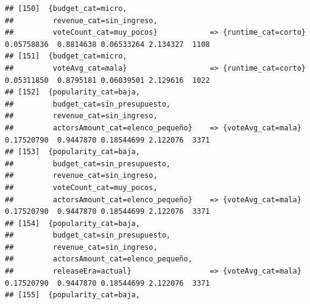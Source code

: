 \documentclass[
]{article}
\begin{document}
\begin{verbatim}
## [150]  {budget_cat=micro,                                                                                                       
##         revenue_cat=sin_ingreso,                                                                                                
##         voteCount_cat=muy_pocos}            => {runtime_cat=corto}               0.05758836  0.8814638 0.06533264 2.134327  1108
## [151]  {budget_cat=micro,                                                                                                       
##         voteAvg_cat=mala}                   => {runtime_cat=corto}               0.05311850  0.8795181 0.06039501 2.129616  1022
## [152]  {popularity_cat=baja,                                                                                                    
##         budget_cat=sin_presupuesto,                                                                                             
##         revenue_cat=sin_ingreso,                                                                                                
##         actorsAmount_cat=elenco_pequeño}    => {voteAvg_cat=mala}                0.17520790  0.9447870 0.18544699 2.122076  3371
## [153]  {popularity_cat=baja,                                                                                                    
##         budget_cat=sin_presupuesto,                                                                                             
##         revenue_cat=sin_ingreso,                                                                                                
##         voteCount_cat=muy_pocos,                                                                                                
##         actorsAmount_cat=elenco_pequeño}    => {voteAvg_cat=mala}                0.17520790  0.9447870 0.18544699 2.122076  3371
## [154]  {popularity_cat=baja,                                                                                                    
##         budget_cat=sin_presupuesto,                                                                                             
##         revenue_cat=sin_ingreso,                                                                                                
##         actorsAmount_cat=elenco_pequeño,                                                                                        
##         releaseEra=actual}                  => {voteAvg_cat=mala}                0.17520790  0.9447870 0.18544699 2.122076  3371
## [155]  {popularity_cat=baja,                                                                                                    

\end{verbatim}
\end{document}
